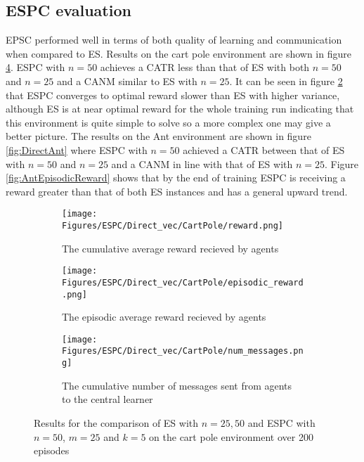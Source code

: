 \subsection{ESPC evaluation}
\label{sec:ESPCDirect}
EPSC performed well in terms of both quality of learning and communication when compared to ES. Results on the cart pole environment are shown in figure \ref{fig:DirectCP}. ESPC with $n=50$ achieves a CATR less than that of ES with both $n=50$ and $n=25$ and a CANM similar to ES with $n=25$. It can be seen in figure \ref{fig:CPEpisodicReward} that ESPC converges to optimal reward slower than ES with higher variance, although ES is at near optimal reward for the whole training run indicating that this environment is quite simple to solve so a more complex one may give a better picture. The results on the Ant environment are shown in figure \ref{fig:DirectAnt} where ESPC with $n=50$ achieved a CATR between that of ES with $n=50$ and $n=25$ and a CANM in line with that of ES with $n=25$. Figure \ref{fig:AntEpisodicReward} shows that by the end of training ESPC is receiving a reward greater than that of both ES instances and has a general upward trend. 
\begin{figure}
    \centering
    \begin{subfigure}{0.5\textwidth}
        \centering
        \texttt{[image: Figures/ESPC/Direct\_vec/CartPole/reward.png]}
        \caption{The cumulative average reward recieved by agents}
        \label{fig:CPReward}
    \end{subfigure}
    \begin{subfigure}{0.5\textwidth}
        \centering
        \texttt{[image: Figures/ESPC/Direct\_vec/CartPole/episodic\_reward.png]}
        \caption{The episodic average reward recieved by agents}
        \label{fig:CPEpisodicReward}
    \end{subfigure}
    \begin{subfigure}{0.5\textwidth}
        \centering
        \texttt{[image: Figures/ESPC/Direct\_vec/CartPole/num\_messages.png]}
        \caption{The cumulative number of messages sent from agents to the central learner}
        \label{fig:CPMessages}
    \end{subfigure}
    \caption{Results for the comparison of ES with $n=25,50$ and ESPC with $n=50$, $m=25$ and $k=5$ on the cart pole environment over 200 episodes}
    \label{fig:DirectCP}
\end{figure}

